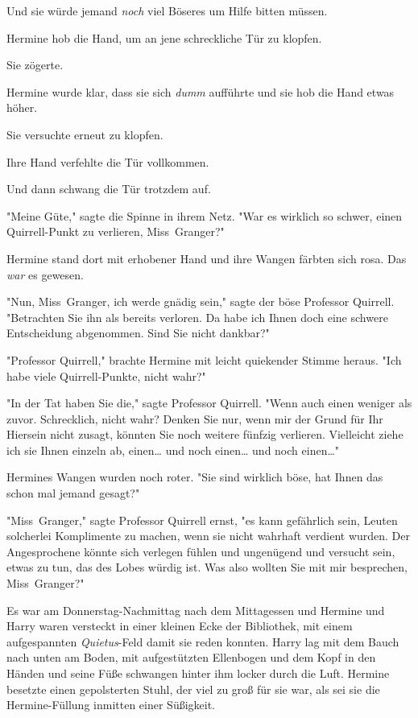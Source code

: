 {Und sie würde jemand \emph{noch} viel Böseres um Hilfe bitten müssen.

Hermine hob die Hand, um an jene schreckliche Tür zu klopfen.

Sie zögerte.

Hermine wurde klar, dass sie sich \emph{dumm} aufführte und sie hob die Hand etwas höher.

Sie versuchte erneut zu klopfen.

Ihre Hand verfehlte die Tür vollkommen.

Und dann schwang die Tür trotzdem auf.

"Meine Güte," sagte die Spinne in ihrem Netz. "War es wirklich so schwer, einen Quirrell-Punkt zu verlieren, Miss~Granger?"

Hermine stand dort mit erhobener Hand und ihre Wangen färbten sich rosa. Das \emph{war} es gewesen.

"Nun, Miss~Granger, ich werde gnädig sein," sagte der böse Professor Quirrell. "Betrachten Sie ihn als bereits verloren. Da habe ich Ihnen doch eine schwere Entscheidung abgenommen. Sind Sie nicht dankbar?"

"Professor Quirrell," brachte Hermine mit leicht quiekender Stimme heraus. "Ich habe viele Quirrell-Punkte, nicht wahr?"

"In der Tat haben Sie die," sagte Professor Quirrell. "Wenn auch einen weniger als zuvor. Schrecklich, nicht wahr? Denken Sie nur, wenn mir der Grund für Ihr Hiersein nicht zusagt, könnten Sie noch weitere fünfzig verlieren. Vielleicht ziehe ich sie Ihnen einzeln ab, einen… und noch einen… und noch einen…"

Hermines Wangen wurden noch roter. "Sie sind wirklich böse, hat Ihnen das schon mal jemand gesagt?"

"Miss~Granger," sagte Professor Quirrell ernst, "es kann gefährlich sein, Leuten solcherlei Komplimente zu machen, wenn sie nicht wahrhaft verdient wurden. Der Angesprochene könnte sich verlegen fühlen und ungenügend und versucht sein, etwas zu tun, das des Lobes würdig ist. Was also wollten Sie mit mir besprechen, Miss~Granger?"

\later

Es war am Donnerstag-Nachmittag nach dem Mittagessen und Hermine und Harry waren versteckt in einer kleinen Ecke der Bibliothek, mit einem aufgespannten \emph{Quietus}-Feld damit sie reden konnten. Harry lag mit dem Bauch nach unten am Boden, mit aufgestützten Ellenbogen und dem Kopf in den Händen und seine Füße schwangen hinter ihm locker durch die Luft. Hermine besetzte einen gepolsterten Stuhl, der viel zu groß für sie war, als sei sie die Hermine-Füllung inmitten einer Süßigkeit.

}
